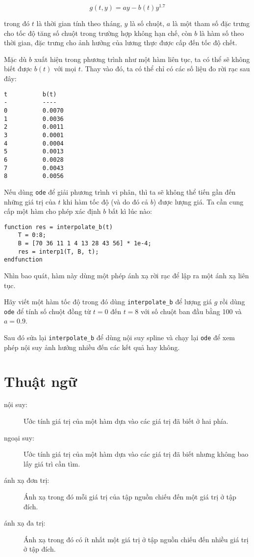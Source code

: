 \documentclass[12pt]{book}
\begin{document}
\[ g(t, y) = ay - b(t) y^{1.7} \]

trong đó  $t$ là thời gian tính theo tháng, $y$ là số chuột, $a$ là một tham số 
đặc trưng cho tốc độ tăng số chuột trong trường hợp không hạn chế, còn 
$b$ là hàm số theo thời gian, đặc trưng cho ảnh hưởng của lương thực 
được cấp đến tốc độ chết.

Mặc dù $b$ xuất hiện trong phương trình như một hàm liên tục, ta có thể sẽ 
không biết được $b(t)$ với mọi $t$.  Thay vào đó, ta có thể chỉ có các số liệu đo 
rời rạc sau đây:

\begin{verbatim}
t          b(t)
-          ----
0          0.0070
1          0.0036             
2          0.0011
3          0.0001
4          0.0004
5          0.0013
6          0.0028
7          0.0043
8          0.0056
\end{verbatim}
%
Nếu dùng {\tt ode} để giải phương trình vi phân, thì ta sẽ không thể 
tiến gần đến những giá trị của $t$ khi hàm tốc độ (và do đó cả $b$) 
được lượng giá. Ta cần cung cấp một hàm cho phép xác định $b$ bất kì lúc nào:

\begin{verbatim}
function res = interpolate_b(t)
    T = 0:8;
    B = [70 36 11 1 4 13 28 43 56] * 1e-4;
    res = interp1(T, B, t);
endfunction
\end{verbatim}
%
Nhìn bao quát, hàm này dùng một phép ánh xạ rời rạc để lập ra một 
ánh xạ liên tục.

\begin{ex}
Hãy viết một hàm tốc độ trong đó dùng \verb#interpolate_b# để 
lượng giá  $g$ rồi dùng {\tt ode} để tính số chuột đồng từ 
$t=0$ đến $t=8$ với số chuột ban đầu bằng 100 và $a=0.9$.

Sau đó sửa lại   \verb#interpolate_b# để dùng nội suy spline và 
chạy lại  {\tt ode} để xem phép nội suy ảnh hưởng nhiều đến các kết 
quả hay không.
\end{ex}

\section{Thuật ngữ}

\begin{description}

\item[nội suy:] Ước tính giá trị của một hàm dựa vào các giá trị đã biết 
ở hai phía.

\item[ngoại suy:] Ước tính giá trị của một hàm dựa vào các giá trị đã biết 
nhưng không bao lấy giá trì cần tìm.

\item[ánh xạ đơn trị:] Ánh xạ trong đó mỗi giá trị của tập nguồn chiếu 
đến một giá trị ở tập đích.

\item[ánh xạ đa trị:] Ánh xạ trong đó có ít nhất một giá trị ở tập nguồn chiếu 
đến nhiều giá trị ở tập đích.

\end{description}
\end{document}
